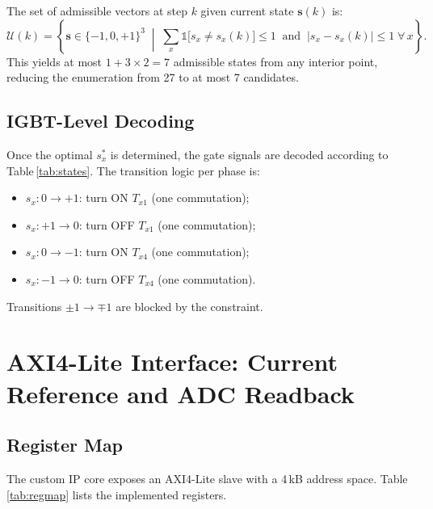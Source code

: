 \documentclass[11pt,a4paper]{article}
\begin{document}
The set of admissible vectors at step $k$ given current state
$\bm{s}(k)$ is:
\begin{equation}
  \mathcal{U}(k) = \left\{ \bm{s} \in \{-1,0,+1\}^3 \;\middle|\;
    \sum_{x} \mathbb{1}\bigl[s_x \neq s_x(k)\bigr] \leq 1
    \;\;\text{and}\;\;
    |s_x - s_x(k)| \leq 1 \;\forall\,x \right\}.
  \label{eq:admissible}
\end{equation}
This yields at most $1 + 3\times 2 = 7$ admissible states from any
interior point, reducing the enumeration from 27 to at most 7 candidates.

\subsection{IGBT-Level Decoding}
\label{sec:decode}

Once the optimal $s_x^*$ is determined, the gate signals are decoded
according to Table\,\ref{tab:states}.  The transition logic per phase is:
\begin{itemize}
  \item $s_x: 0 \to +1$: turn ON $T_{x1}$ (one commutation);
  \item $s_x: +1 \to 0$: turn OFF $T_{x1}$ (one commutation);
  \item $s_x: 0 \to -1$: turn ON $T_{x4}$ (one commutation);
  \item $s_x: -1 \to 0$: turn OFF $T_{x4}$ (one commutation).
\end{itemize}
Transitions $\pm 1 \to \mp 1$ are blocked by the constraint.

\section{AXI4-Lite Interface: Current Reference and ADC Readback}
\label{sec:axi}

\subsection{Register Map}
\label{sec:regmap}

The custom IP core exposes an AXI4-Lite slave with a 4\,kB address space.
Table\,\ref{tab:regmap} lists the implemented registers.
\end{document}
